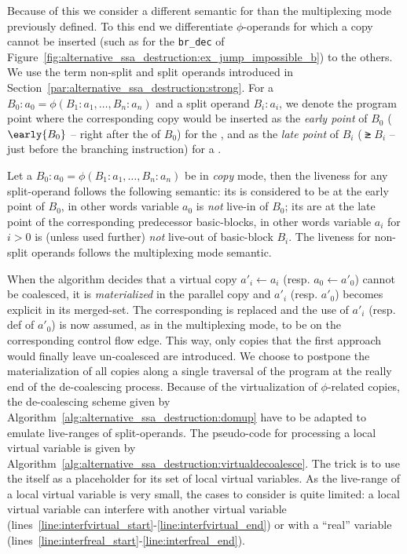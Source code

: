 Because of this we consider a different semantic for \phifuns than the multiplexing mode previously defined. To this end we differentiate $\phi$-operands for which a copy cannot be inserted (such as for the \texttt{br\_dec} of Figure~\ref{fig:alternative_ssa_destruction:ex_jump_impossible_b}) to the others. We use the term non-split and split operands introduced in Section~\ref{par:alternative_ssa_destruction:strong}. For a \phifun $B_0:a_0=\phi(B_1:a_1,\dots,B_n:a_n)$ and a split operand $B_i:a_i$, we denote the  program point where the corresponding copy would be inserted as the \emph{early point} of $B_0$ ($\early{B_0}$ -- right after the \phifuns of $B_0$) for the , and as the \emph{late point} of $B_i$ ($\late{B_i}$ -- just before the branching instruction) for a \useop.
\begin{definition}
Let a \phifun $B_0:a_0=\phi(B_1:a_1,\dots,B_n:a_n)$ be in \emph{copy} mode, then the liveness for any split-operand follows the following semantic: its  is considered to be at the early point of $B_0$, in other words variable $a_0$ is \emph{not} live-in of $B_0$; its \useops are at the late point of the corresponding predecessor basic-blocks, in other words variable $a_i$ for $i>0$ is (unless used further) \emph{not} live-out of basic-block $B_i$. The liveness for non-split operands follows the multiplexing mode semantic. 
\end{definition}

When the algorithm decides that a virtual copy $a'_i \gets a_i$ (resp. $a_0 \gets a'_0$)  cannot be coalesced, it is \emph{materialized} in the parallel copy and $a'_i$ (resp. $a'_0$) becomes explicit in its merged-set. 
The corresponding \phiop is replaced and the use of $a'_i$ (resp. def of $a'_0$) is now assumed, as in the multiplexing mode, to be on the corresponding control flow edge. 
This way, only copies that the first approach would finally leave un-coalesced are introduced. We choose to postpone the materialization of
all copies along a single traversal of the program at the really end of the de-coalescing process. 
%
Because of the virtualization of $\phi$-related copies, the de-coalescing scheme given by Algorithm~\ref{alg:alternative_ssa_destruction:domup} have to be adapted to emulate live-ranges of split-operands. The pseudo-code for processing a local virtual variable is given by Algorithm~\ref{alg:alternative_ssa_destruction:virtualdecoalesce}. The trick is to use the \phifun itself as a placeholder for its set of local virtual variables. As the live-range of a local virtual variable is very small, the cases to consider is quite limited: a local virtual variable can interfere with another virtual variable (lines~\ref{line:interfvirtual_start}-\ref{line:interfvirtual_end}) or with a ``real'' variable (lines~\ref{line:interfreal_start}-\ref{line:interfreal_end}).

